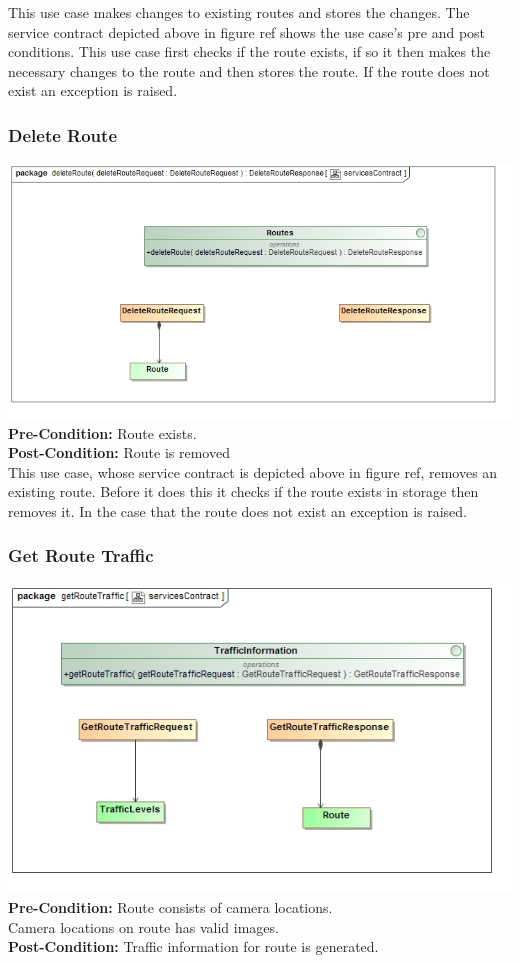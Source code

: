 \documentclass[a4paper,12pt]{article}
\begin{document}
This use case makes changes to existing routes and stores the changes. The service contract depicted above in {figure ref} shows the use case's pre and post conditions. This use case first checks if the route exists, if so it then makes the necessary changes to the route and then stores the route. If the route does not exist an exception is raised. 
\subsubsection{Delete Route}
\includegraphics[width=\textwidth]{images/scDelete_Route.jpg}
\textbf{Pre-Condition: }
Route exists.\\
\textbf{Post-Condition: }
Route is removed\\
This use case, whose service contract is depicted above in {figure ref}, removes an existing route. Before it does this it checks if the route exists in storage then removes it. In the case that the route does not exist an exception is raised.
\subsubsection{Get Route Traffic}
\includegraphics[width=\textwidth]{images/scDetermine_Traffic.jpg}
\textbf{Pre-Condition: }
Route consists of camera locations.\\
Camera locations on route has valid images.\\
\textbf{Post-Condition: }
Traffic information for route is generated.\\
\end{document}
